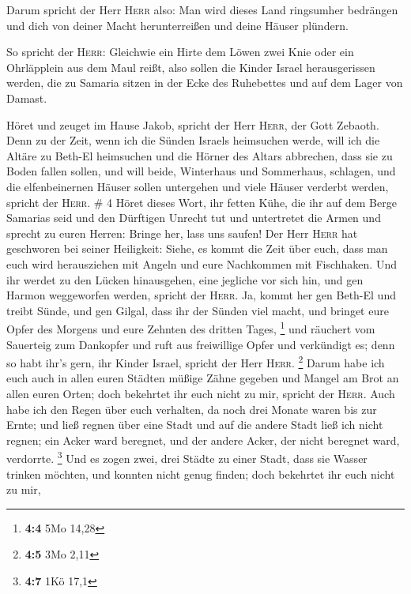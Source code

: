  Darum spricht der Herr \textsc{Herr} also: Man wird
dieses Land ringsumher bedrängen und dich von deiner Macht
herunterreißen und deine Häuser plündern.

 So spricht der \textsc{Herr}: Gleichwie ein Hirte dem
Löwen zwei Knie oder ein Ohrläpplein aus dem Maul reißt, also sollen die
Kinder Israel herausgerissen werden, die zu Samaria sitzen in der Ecke
des Ruhebettes und auf dem Lager von Damast.

 Höret und zeuget im Hause Jakob, spricht der Herr
\textsc{Herr}, der Gott Zebaoth.  Denn zu der Zeit, wenn
ich die Sünden Israels heimsuchen werde, will ich die Altäre zu Beth-El
heimsuchen und die Hörner des Altars abbrechen, dass sie zu Boden fallen
sollen,  und will beide, Winterhaus und Sommerhaus,
schlagen, und die elfenbeinernen Häuser sollen untergehen und viele
Häuser verderbt werden, spricht der \textsc{Herr}. \# 4 
Höret dieses Wort, ihr fetten Kühe, die ihr auf dem Berge Samarias seid
und den Dürftigen Unrecht tut und untertretet die Armen und sprecht zu
euren Herren: Bringe her, lass uns saufen!  Der Herr
\textsc{Herr} hat geschworen bei seiner Heiligkeit: Siehe, es kommt die
Zeit über euch, dass man euch wird herausziehen mit Angeln und eure
Nachkommen mit Fischhaken.  Und ihr werdet zu den Lücken
hinausgehen, eine jegliche vor sich hin, und gen Harmon weggeworfen
werden, spricht der \textsc{Herr}.  Ja, kommt her gen
Beth-El und treibt Sünde, und gen Gilgal, dass ihr der Sünden viel
macht, und bringet eure Opfer des Morgens und eure Zehnten des dritten
Tages, \footnote{\textbf{4:4} 5Mo 14,28}  und räuchert vom
Sauerteig zum Dankopfer und ruft aus freiwillige Opfer und verkündigt
es; denn so habt ihr's gern, ihr Kinder Israel, spricht der Herr
\textsc{Herr}. \footnote{\textbf{4:5} 3Mo 2,11}  Darum
habe ich euch auch in allen euren Städten müßige Zähne gegeben und
Mangel am Brot an allen euren Orten; doch bekehrtet ihr euch nicht zu
mir, spricht der \textsc{Herr}.  Auch habe ich den Regen
über euch verhalten, da noch drei Monate waren bis zur Ernte; und ließ
regnen über eine Stadt und auf die andere Stadt ließ ich nicht regnen;
ein Acker ward beregnet, und der andere Acker, der nicht beregnet ward,
verdorrte. \footnote{\textbf{4:7} 1Kö 17,1}  Und es zogen
zwei, drei Städte zu einer Stadt, dass sie Wasser trinken möchten, und
konnten nicht genug finden; doch bekehrtet ihr euch nicht zu mir,
